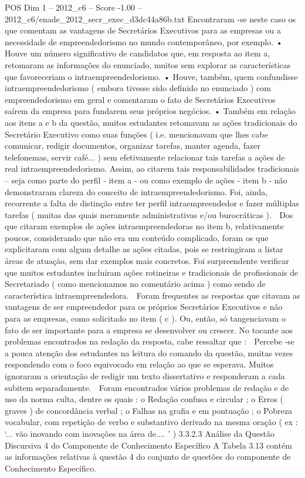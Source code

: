 \begin{textsample}{POS Dim 1 – 2012\_c6 – Score -1.00 – 2012\_c6/enade\_2012\_secr\_exec\_d3dc44a86b.txt}
Encontraram -se neste caso os que comentam as vantagens de Secretários Executivos para as empresas ou a necessidade de empreendedorismo no mundo contemporâneo, por exemplo. • Houve um número significativo de candidatos que, em resposta ao item a, retomaram as informações do enunciado, muitos sem explorar as características que favoreceriam o intraempreendedorismo. • Houve, também, quem confundisse intraempreendedorismo ( embora tivesse sido definido no enunciado ) com empreendedorismo em geral e comentaram o fato de Secretários Executivos saírem da empresa para fundarem seus próprios negócios. • Também em relação aos itens a e b da questão, muitos estudantes retomavam as ações tradicionais do Secretário Executivo como suas funções ( i.e. mencionavam que lhes cabe comunicar, redigir documentos, organizar tarefas, manter agenda, fazer telefonemas, servir café... ) sem efetivamente relacionar tais tarefas a ações de real intraempreendedorismo.
Assim, ao citarem tais responsabilidades tradicionais – seja como parte do perfil - item a - ou como exemplo de ações - item b - não demonstraram clareza do conceito de intraempreendedorismo.
Foi, ainda, recorrente a falta de distinção entre ter perfil intraempreendedor e fazer múltiplas tarefas ( muitas das quais meramente administrativas e/ou burocráticas ).  Dos que citaram exemplos de ações intraempreendedoras no item b, relativamente poucos, considerando que não era um conteúdo complicado, foram os que explicitaram com algum detalhe as ações citadas, pois se restringiram a listar áreas de atuação, sem dar exemplos mais concretos.
Foi surpreendente verificar que muitos estudantes incluíram ações rotineiras e tradicionais de profissionais de Secretariado ( como mencionamos no comentário acima ) como sendo de característica intraempreendedora.  Foram frequentes as respostas que citavam as vantagens de ser empreendedor para os próprios Secretários Executivos e não para as empresas, como solicitado no item ( c ).
Ou, então, só tangenciavam o fato de ser importante para a empresa se desenvolver ou crescer.
No tocante aos problemas encontrados na redação da resposta, cabe ressaltar que :  Percebe -se a pouca atenção dos estudantes na leitura do comando da questão, muitas vezes respondendo com o foco equivocado em relação ao que se esperava.
Muitos ignoraram a orientação de redigir um texto dissertativo e responderam a cada subitem separadamente.  Foram encontrados vários problemas de redação e de uso da norma culta, dentre os quais : o Redação confusa e circular ; o Erros ( graves ) de concordância verbal ; o Falhas na grafia e em pontuação ; o Pobreza vocabular, com repetição de verbo e substantivo derivado na mesma oração ( ex : ‘... vão inovando com inovações na área de.... ’ ) 3.3.2.3 Análise da Questão Discursiva 4 do Componente de Conhecimento Específico A Tabela 3.13 contém as informações relativas à questão 4 do conjunto de questões do componente de Conhecimento Específico.

\end{textsample}
